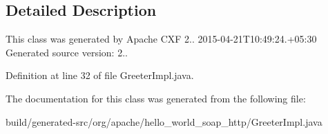\subsection{Detailed Description}
This class was generated by Apache C\+X\+F 2.. 2015-\/04-\/21\+T10\+:49\+:24.+05\+:30 Generated source version\+: 2.. 

Definition at line 32 of file Greeter\+Impl.\+java.



The documentation for this class was generated from the following file\+:\begin{DoxyCompactItemize}
\item 
build/generated-\/src/org/apache/hello\+\_\+world\+\_\+soap\+\_\+http/Greeter\+Impl.\+java\end{DoxyCompactItemize}
